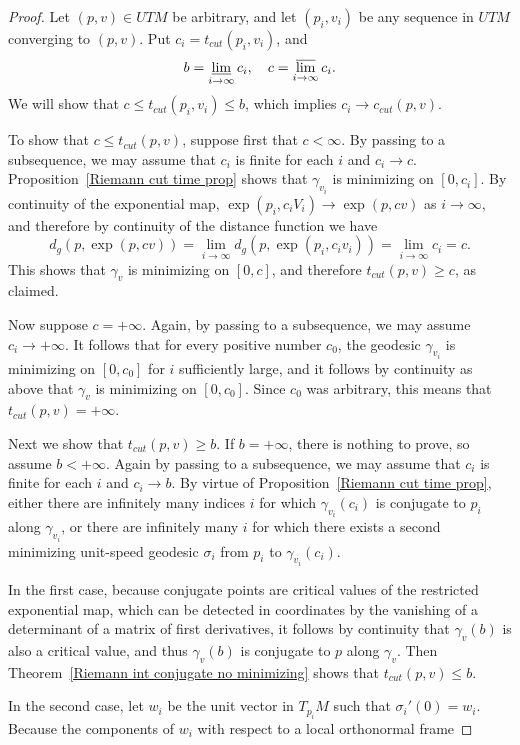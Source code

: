 \begin{proof}
Let $(p,v)\in UTM$ be arbitrary, and let $(p_i,v_i)$ be any sequence in $UTM$ converging to $(p,v)$. Put $c_i=t_{cut}(p_i,v_i)$, and
\[b=\varliminf_{i\to\infty}c_i,\quad c=\varlimsup_{i\to\infty}c_i.\]
We will show that $c\leq t_{cut}(p_i,v_i)\leq b$, which implies $c_i\to c_{cut}(p,v)$.\par
To show that $c\leq t_{cut}(p,v)$, suppose first that $c<\infty$. By passing to a subsequence, we may assume that $c_i$ is finite for each $i$ and $c_i\to c$. 
Proposition~\ref{Riemann cut time prop} shows that $\gamma_{v_i}$ is minimizing on $[0,c_i]$. By continuity of the exponential map, $\exp(p_i,c_iV_i)\to\exp(p,cv)$ as 
$i\to\infty$, and therefore by continuity of the distance function we have
\[d_g(p,\exp(p,cv))=\lim_{i\to\infty}d_g(p,\exp(p_i,c_iv_i))=\lim_{i\to\infty}c_i=c.\]
This shows that $\gamma_v$ is minimizing on $[0,c]$, and therefore $t_{cut}(p,v)\geq c$, as claimed.\par
Now suppose $c=+\infty$. Again, by passing to a subsequence, we may assume $c_i\to+\infty$. It follows that for every positive number $c_0$, the geodesic $\gamma_{v_i}$ 
is minimizing on $[0,c_0]$ for $i$ sufficiently large, and it follows by continuity as above that $\gamma_v$ is minimizing on $[0,c_0]$. Since $c_0$ was arbitrary, this 
means that $t_{cut}(p,v)=+\infty$.\par
Next we show that $t_{cut}(p,v)\geq b$. If $b=+\infty$, there is nothing to prove, so assume $b<+\infty$. Again by passing to a subsequence, we may assume that $c_i$ is 
finite for each $i$ and $c_i\to b$. By virtue of Proposition~\ref{Riemann cut time prop}, either there are infinitely many indices $i$ for which $\gamma_{v_i}(c_i)$ is 
conjugate to $p_i$ along $\gamma_{v_i}$, or there are infinitely many $i$ for which there exists a second minimizing unit-speed geodesic $\sigma_i$ from $p_i$ to 
$\gamma_{v_i}(c_i)$.\par
In the first case, because conjugate points are critical values of the restricted exponential map, which can be detected in coordinates by the vanishing of a determinant 
of a matrix of first derivatives, it follows by continuity that $\gamma_v(b)$ is also a critical value, and thus $\gamma_v(b)$ is conjugate to $p$ along $\gamma_v$. 
Then Theorem~\ref{Riemann int conjugate no minimizing} shows that $t_{cut}(p,v)\leq b$.\par
In the second case, let $w_i$ be the unit vector in $T_{p_i}M$ such that $\sigma_i'(0)=w_i$. Because the components of $w_i$ with respect to a local orthonormal frame 

\end{proof}
